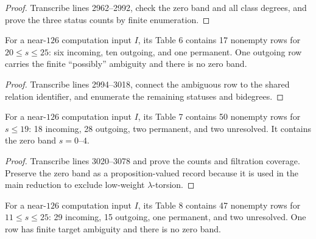 \begin{proof}
  Transcribe lines 2962--2992, check the zero band and all class degrees, and
  prove the three status counts by finite enumeration.
\end{proof}

\begin{proposition}
  \label{data:table-s125-high}
  \notready
  For a near-$126$ computation input $I$, its Table 6 contains 17 nonempty rows
  for $20\le s\le25$: six incoming, ten outgoing, and one permanent.  One
  outgoing row carries the finite ``possibly'' ambiguity and there is no zero
  band.
\end{proposition}

\begin{proof}
  Transcribe lines 2994--3018, connect the ambiguous row to the shared relation
  identifier, and enumerate the remaining statuses and bidegrees.
\end{proof}

\begin{proposition}
  \label{data:table-s125-low}
  \notready
  For a near-$126$ computation input $I$, its Table 7 contains 50 nonempty rows
  for $s\le19$: 18 incoming, 28 outgoing, two permanent, and two unresolved.
  It contains the zero band $s=0$--$4$.
\end{proposition}

\begin{proof}
  Transcribe lines 3020--3078 and prove the counts and filtration coverage.
  Preserve the zero band as a proposition-valued record because it is used in
  the main reduction to exclude low-weight $\lambda$-torsion.
\end{proof}

\begin{proposition}
  \label{data:table-s126-high}
  \notready
  For a near-$126$ computation input $I$, its Table 8 contains 47 nonempty rows
  for $11\le s\le25$: 29 incoming, 15 outgoing, one permanent, and two
  unresolved.  One row has finite target ambiguity and there is no zero band.
\end{proposition}

